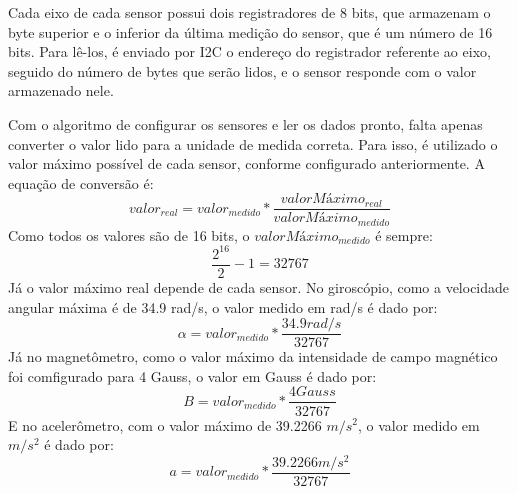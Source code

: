 \documentclass[
	12pt,				%
	openright,			%
	twoside,			%
	convert,
	a4paper,			%
	english,			%
	french,				%
	spanish,			%
	brazil				%
	]{abntex2}
\begin{document}
Cada eixo de cada sensor possui dois registradores de 8 bits, que armazenam o byte superior e o inferior da última medição do sensor, que é um número de 16 bits. Para lê-los, é enviado por I2C o endereço do registrador referente ao eixo, seguido do número de bytes que serão lidos, e o sensor responde com o valor armazenado nele.
\par
Com o algoritmo de configurar os sensores e ler os dados pronto, falta apenas converter o valor lido para a unidade de medida correta. Para isso, é utilizado o valor máximo possível de cada sensor, conforme configurado anteriormente. A equação de conversão é:
\begin{equation}
	valor_{real} = valor_{medido} * \frac{valorMáximo_{real}}{valorMáximo_{medido}}
\end{equation}
Como todos os valores são de 16 bits, o $valorMáximo_{medido}$ é sempre:
\begin{equation}
	\frac{2^{16}}{2} - 1 = 32767
\end{equation}
Já o valor máximo real depende de cada sensor.
No giroscópio, como a velocidade angular máxima é de 34.9 rad/s, o valor medido em rad/s é dado por:
\begin{equation}
	\alpha = valor_{medido} * \frac{34.9 rad/s}{32767}
\end{equation}
Já no magnetômetro, como o valor máximo da intensidade de campo magnético foi comfigurado para 4 Gauss, o valor em Gauss é dado por:
\begin{equation}
	B = valor_{medido} * \frac{4 Gauss}{32767}
\end{equation}
E no acelerômetro, com o valor máximo de 39.2266 $m/s^{2}$, o valor medido em $m/s^{2}$ é dado por:
\begin{equation}
	a = valor_{medido} * \frac{39.2266 m/s^{2}}{32767}
\end{equation}
\end{document}
